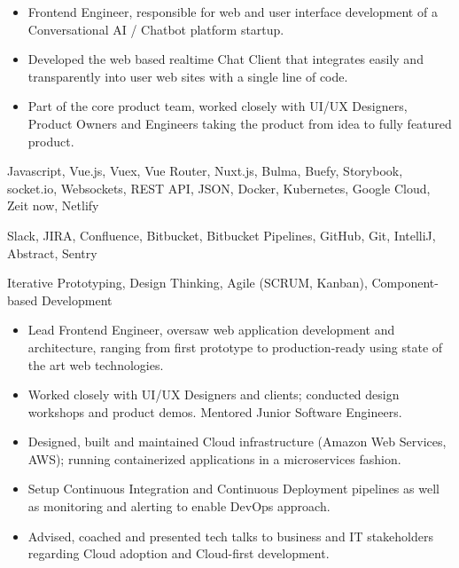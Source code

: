 
\medskip
\begin{itemize}
	\item Frontend Engineer, responsible for web and user interface development of a Conversational AI / Chatbot platform startup.
	\item Developed the web based realtime Chat Client that integrates easily and transparently into user web sites with a single line of code.
	\item Part of the core product team, worked closely with UI/UX Designers, Product Owners and Engineers taking the product from idea to fully featured product.
\end{itemize}

\medskip
\begin{description}
	\ifincludestech
	\item [Technologies] Javascript, Vue.js, Vuex, Vue Router, Nuxt.js, Bulma, Buefy, Storybook, socket.io, Websockets, REST API, JSON, Docker, Kubernetes, Google Cloud, Zeit now, Netlify
	\fi
	\ifincludestools
	\item [Tools] Slack, JIRA, Confluence, Bitbucket, Bitbucket Pipelines, GitHub, Git, IntelliJ, Abstract, Sentry
	\fi
	\ifincludesmethods
	\item [Methodologies] Iterative Prototyping, Design Thinking, Agile (SCRUM, Kanban), Component-based Development	\fi
\end{description}

\divider



\medskip
\begin{itemize}
	\item Lead Frontend Engineer, oversaw web application development and architecture, ranging from first prototype to production-ready using state of the art web technologies.
	\item Worked closely with UI/UX Designers and clients; conducted design workshops and product demos. Mentored Junior Software Engineers.
	\item Designed, built and maintained Cloud infrastructure (Amazon Web Services, AWS); running containerized applications in a microservices fashion.
	\item Setup Continuous Integration and Continuous Deployment pipelines as well as monitoring and alerting to enable DevOps approach.
	\item Advised, coached and presented tech talks to business and IT stakeholders regarding Cloud adoption and Cloud-first development.
\end{itemize}

